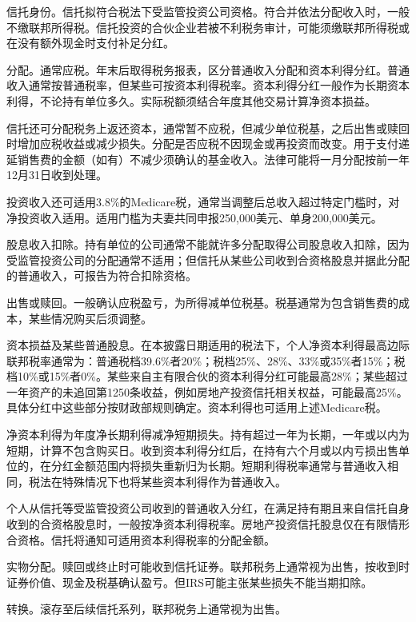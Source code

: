 \documentclass[UTF8,fontset=none,11pt,a4paper]{ctexart}
\begin{document}
信托身份。信托拟符合税法下受监管投资公司资格。符合并依法分配收入时，一般不缴联邦所得税。信托投资的合伙企业若被不利税务审计，可能须缴联邦所得税或在没有额外现金时支付\allowbreak\mbox{补足分红。}


分配。通常应税。年末后取得税务报表，区分普通收入分配和资本利得分红。普通收入通常按普通税率，但某些可按资本利得税率。资本利得分红一般作为长期资本利得，不论持有单位多久。实际税额须结合年度其他交易计算净\allowbreak\mbox{资本损益。}


信托还可分配税务上返还资本，通常暂不应税，但减少单位税基，之后出售或赎回时增加应税收益或减少损失。分配是否应税不因现金或再投资而改变。用于支付递延销售费的金额（如有）不减少须确认的基金收入。法律可能将一月分配按前一年12月31日\allowbreak\mbox{收到处理。}


投资收入还可适用3.8\%的Medicare税，通常当调整后总收入超过特定门槛时，对净投资收入适用。适用门槛为夫妻共同申报250,000美元、单身200,000美元。


股息收入扣除。持有单位的公司通常不能就许多分配取得公司股息收入扣除，因为受监管投资公司的分配通常不适用；但信托从某些公司收到合资格股息并据此分配的普通收入，可报告为符合\allowbreak\mbox{扣除资格。}


出售或赎回。一般确认应税盈亏，为所得减单位税基。税基通常为包含销售费的成本，某些情况购买\allowbreak\mbox{后须调整。}


资本损益及某些普通股息。在本披露日期适用的税法下，个人净资本利得最高边际联邦税率通常为：普通税档39.6\%者20\%；税档25\%、28\%、33\%或35\%者15\%；税档10\%或15\%者0\%。某些来自主有限合伙的资本利得分红可能最高28\%；某些超过一年资产的未追回第1250条收益，例如房地产投资信托相关权益，可能最高25\%。具体分红中这些部分按财政部规则确定。资本利得也可适用上述Medicare税。


净资本利得为年度净长期利得减净短期损失。持有超过一年为长期，一年或以内为短期，计算不包含购买日。收到资本利得分红后，在持有六个月或以内亏损出售单位的，在分红金额范围内将损失重新归为长期。短期利得税率通常与普通收入相同，税法在特殊情况下也将某些资本利得作为\allowbreak\mbox{普通收入。}


个人从信托等受监管投资公司收到的普通收入分红，在满足持有期且来自信托自身收到的合资格股息时，一般按净资本利得税率。房地产投资信托股息仅在有限情形合资格。信托将通知可适用资本利得税率的\allowbreak\mbox{分配金额。}


实物分配。赎回或终止时可能收到信托证券。联邦税务上通常视为出售，按收到时证券价值、现金及税基确认盈亏。但IRS可能主张某些损失不能\allowbreak\mbox{当期扣除。}


转换。滚存至后续信托系列，联邦税务上通常\allowbreak\mbox{视为出售。}
\end{document}
